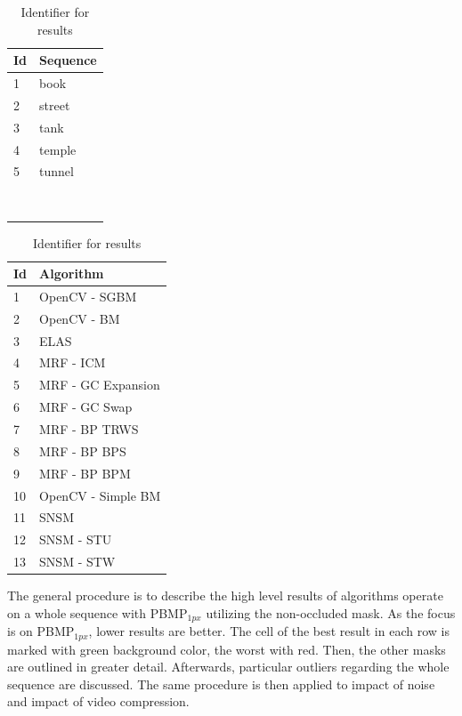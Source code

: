 \begin{table}[h!]
\centering
\begin{tabular}{ll}
  \hline
  \textbf{Id} & \textbf{Sequence} \\ \hline \hline
  1 & book \\
  2 & street \\
  3 & tank \\
  4 & temple \\
  5 & tunnel \\
  & \\
  & \\
  & \\
  & \\
  & \\
  & \\
  & \\
  & \\
  \hline
\end{tabular}
\quad
\begin{tabular}{ll}
  \hline
  \textbf{Id} & \textbf{Algorithm} \\ \hline \hline
  1 & OpenCV - SGBM \\
  2 & OpenCV - BM \\
  3 & ELAS \\
  4 & MRF - ICM \\
  5 & MRF - GC Expansion \\
  6 & MRF - GC Swap \\
  7 & MRF - BP TRWS \\
  8 & MRF - BP BPS \\
  9 & MRF - BP BPM \\
  10 & OpenCV - Simple BM \\
  11 & SNSM \\
  12 & SNSM - STU \\
  13 & SNSM - STW \\
  \hline
\end{tabular}
\caption{Identifier for results}
\label{tab:identifier1}
\end{table}

\noindent The general procedure is to describe the high level results of algorithms operate on a whole sequence with PBMP$_{1px}$ utilizing the non-occluded mask.
As the focus is on PBMP$_{1px}$, lower results are better.
The cell of the best result in each row is marked with green background color, the worst with red.
Then, the other masks are outlined in greater detail.
Afterwards, particular outliers regarding the whole sequence are discussed.
The same procedure is then applied to impact of noise and impact of video compression.

